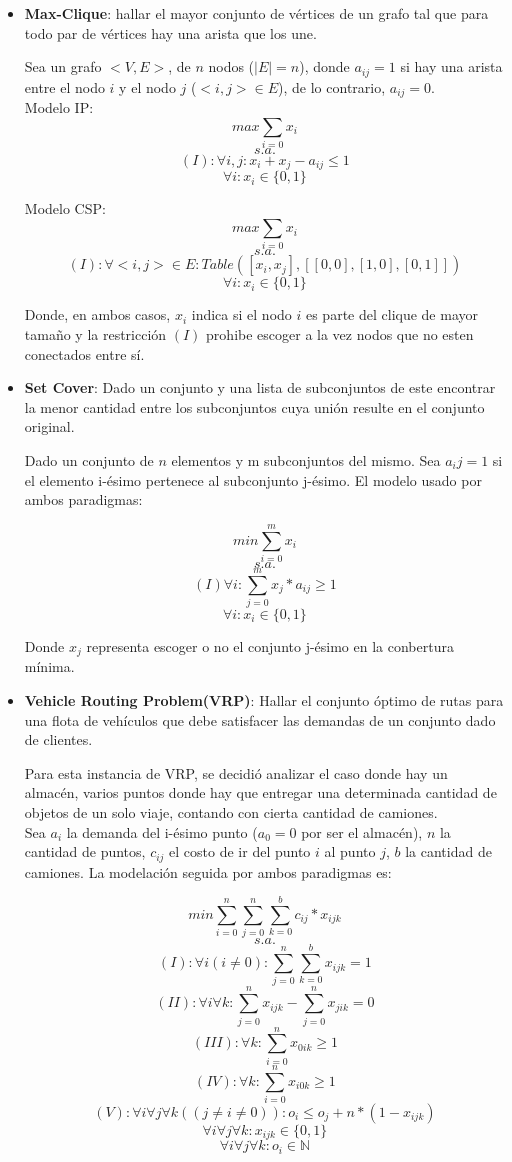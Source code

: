 \documentclass[12pt]{report}
\begin{document}
\begin{itemize}
\item \textbf{Max-Clique}: hallar el mayor conjunto de vértices de un grafo tal que para todo par de vértices hay una arista que los une.

Sea un grafo $<V,E>$, de $n$ nodos ($|E|=n$), donde $a_{ij}=1$ si hay una arista entre el nodo $i$ y el nodo $j$ ($<i,j>\in E$), de lo contrario, $a_{ij}=0$.\\

Modelo IP:
$$max \sum_{i=0} x_i$$
$$s.a.$$
$$(I):\forall i,j: x_i+x_j-a_{ij}\leq 1$$
$$\forall i: x_i\in\{0,1\}$$

Modelo CSP:
$$max \sum_{i=0} x_i$$
$$s.a.$$
$$(I):\forall <i,j> \in E:Table([x_i,x_j],[[0,0],[1,0],[0,1]])$$
$$\forall i: x_i\in\{0,1\}$$

Donde, en ambos casos, $x_i$ indica si el nodo $i$ es parte del clique de mayor tamaño y la restricción $(I)$ prohibe escoger a la vez nodos que no esten conectados entre sí.

\item \textbf{Set Cover}: Dado un conjunto y una lista de subconjuntos de este encontrar la menor cantidad entre los subconjuntos cuya unión resulte en el conjunto original.

Dado un conjunto de $n$ elementos y m subconjuntos del mismo. Sea $a_ij=1$ si el elemento i-ésimo pertenece al subconjunto j-ésimo. El modelo usado por ambos paradigmas:

$$min \sum_{i=0}^m x_i$$
$$s.a.$$
$$(I) \forall i:\sum_{j=0}^mx_{j}*a_{ij}\geq1$$
$$\forall i: x_i\in\{0,1\}$$

Donde $x_j$ representa escoger o no el conjunto j-ésimo en la conbertura mínima.

\item \textbf{Vehicle Routing Problem(VRP)}:  Hallar el conjunto óptimo de rutas para una flota de vehículos que debe satisfacer las demandas de un conjunto dado de clientes.

Para esta instancia de VRP, se decidió analizar el caso donde hay un almacén, varios puntos donde hay que entregar una determinada cantidad de objetos de un solo viaje, contando con cierta cantidad de camiones.\\

Sea $a_i$ la demanda del i-ésimo punto ($a_0=0$ por ser el almacén), $n$ la cantidad de puntos, $c_{ij}$ el costo de ir del punto $i$ al punto $j$, $b$ la cantidad de camiones. La modelación seguida por ambos paradigmas es:

$$min \sum_{i=0}^n\sum_{j=0}^n\sum_{k=0}^bc_{ij}*x_{ijk}$$
$$s.a.$$
$$(I):\forall i(i\neq0):\sum_{j=0}^n\sum_{k=0}^bx_{ijk}=1$$
$$(II):\forall i\forall k :\sum_{j=0}^nx_{ijk}-\sum_{j=0}^nx_{jik}=0$$
$$(III):\forall k:\sum_{i=0}^nx_{0ik}\geq1$$
$$(IV):\forall k:\sum_{i=0}^nx_{i0k}\geq1$$
$$(V):\forall i\forall j\forall k ((j\neq i\neq0)):o_i\leq o_j+n*(1-x_{ijk})$$
$$\forall i\forall j\forall k:x_{ijk}\in\{0,1\}$$
$$\forall i\forall j\forall k:o_{i}\in\mathbb{N}$$


\end{itemize}
\end{document}
